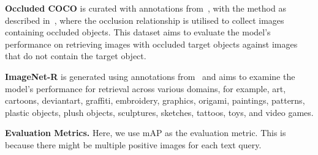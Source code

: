 \vspace{2pt}\noindent \textbf{Occluded COCO} 
is curated with annotations from~\cite{lee2022instance}, 
with the method as described in~\cite{zhan2022tri}, where the occlusion relationship is utilised to collect images containing occluded objects. 
This dataset aims to evaluate the model's performance on retrieving images with occluded target objects against images that do not contain the target object.

\vspace{2pt} \noindent \textbf{ImageNet-R} is generated using annotations from~\cite{hendrycks2021many} and aims to examine the model's performance for retrieval across various domains, 
for example, art, cartoons, deviantart, graffiti, embroidery, graphics, origami, paintings, patterns, plastic objects, plush objects, sculptures, sketches, tattoos, toys, and video games.


\vspace{2pt} \noindent \textbf{Evaluation Metrics.} 
Here, we use mAP as the evaluation metric. This is because there might be multiple positive images for each text query.

